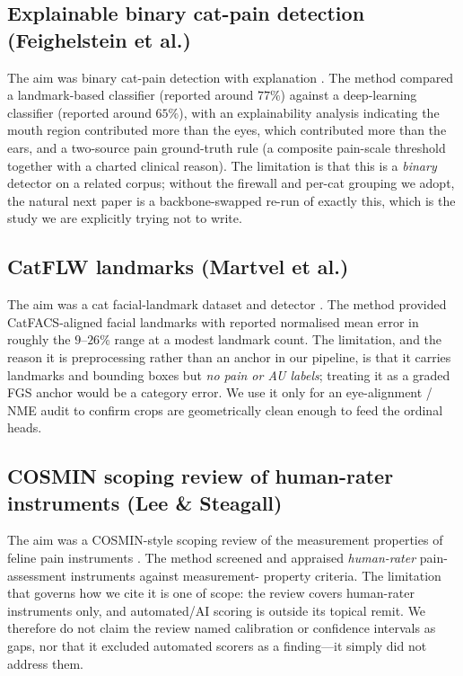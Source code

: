 \subsection{Explainable binary cat-pain detection (Feighelstein et al.)}
The aim was binary cat-pain detection with explanation \cite{feighelstein2023}.
The method compared a landmark-based classifier (reported around $77\%$) against
a deep-learning classifier (reported around $65\%$), with an explainability
analysis indicating the mouth region contributed more than the eyes, which
contributed more than the ears, and a two-source pain ground-truth rule
(a composite pain-scale threshold together with a charted clinical reason). The
limitation is that this is a \emph{binary} detector on a related corpus; without
the firewall and per-cat grouping we adopt, the natural next paper is a
backbone-swapped re-run of exactly this, which is the study we are explicitly
trying not to write.

\subsection{CatFLW landmarks (Martvel et al.)}
The aim was a cat facial-landmark dataset and detector \cite{martvel2024catflw}.
The method provided CatFACS-aligned facial landmarks with reported normalised
mean error in roughly the $9$--$26\%$ range at a modest landmark count. The
limitation, and the reason it is preprocessing rather than an anchor in our
pipeline, is that it carries landmarks and bounding boxes but \emph{no pain or
AU labels}; treating it as a graded FGS anchor would be a category error.
We use it only for an eye-alignment / NME audit to confirm crops are
geometrically clean enough to feed the ordinal heads.

\subsection{COSMIN scoping review of human-rater instruments (Lee \& Steagall)}
The aim was a COSMIN-style scoping review of the measurement properties of
feline pain instruments \cite{leesteagall2026}. The method screened and
appraised \emph{human-rater} pain-assessment instruments against measurement-
property criteria. The limitation that governs how we cite it is one of scope:
the review covers human-rater instruments only, and automated/AI scoring is
outside its topical remit. We therefore do not claim the review named
calibration or confidence intervals as gaps, nor that it excluded automated
scorers as a finding---it simply did not address them.

